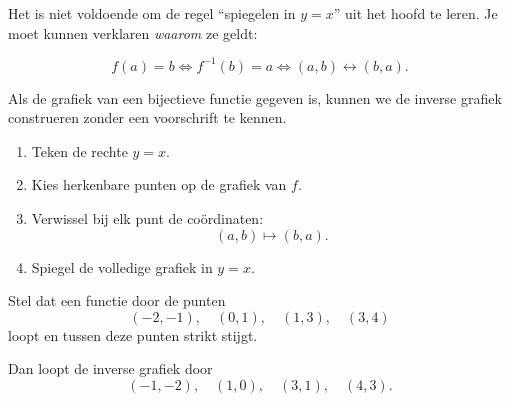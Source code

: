 \documentclass{ximera}
\begin{document}
\begin{opmerking}
Het is niet voldoende om de regel ``spiegelen in \(y=x\)'' uit het hoofd
te leren. Je moet kunnen verklaren \emph{waarom} ze geldt:

\[
f(a)=b
\Longleftrightarrow
f^{-1}(b)=a
\Longleftrightarrow
(a,b)\leftrightarrow(b,a).
\]
\end{opmerking}



Als de grafiek van een bijectieve functie gegeven is, kunnen we de inverse
grafiek construeren zonder een voorschrift te kennen.

\begin{enumerate}
    \item Teken de rechte \(y=x\).
    \item Kies herkenbare punten op de grafiek van \(f\).
    \item Verwissel bij elk punt de coördinaten:
    \[
    (a,b)\mapsto(b,a).
    \]
    \item Spiegel de volledige grafiek in \(y=x\).
\end{enumerate}

\begin{voorbeeld}

Stel dat een functie door de punten
\[
(-2,-1),\quad(0,1),\quad(1,3),\quad(3,4)
\]
loopt en tussen deze punten strikt stijgt.

Dan loopt de inverse grafiek door
\[
(-1,-2),\quad(1,0),\quad(3,1),\quad(4,3).
\]

\begin{center}
\end{center}
\end{voorbeeld}
\end{document}
